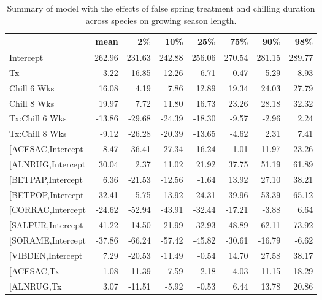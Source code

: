 \documentclass{article}\usepackage[]{graphicx}\usepackage[]{color}
\makeatletter
\newenvironment{kframe}{%
 \def\at@end@of@kframe{}%
 \ifinner\ifhmode%
  \def\at@end@of@kframe{\end{minipage}}%
  \begin{minipage}{\columnwidth}%
 \fi\fi%
 \def\FrameCommand##1{\hskip\@totalleftmargin \hskip-\fboxsep
 \colorbox{shadecolor}{##1}\hskip-\fboxsep
     \hskip-\linewidth \hskip-\@totalleftmargin \hskip\columnwidth}%
 \MakeFramed {\advance\hsize-\width
   \@totalleftmargin\z@ \linewidth\hsize
   \@setminipage}}%
 {\par\unskip\endMakeFramed%
 \at@end@of@kframe}
\makeatother
\begin{document}
\newpage
\begin{kframe}


{\ttfamily\noindent\bfseries\color{errorcolor}{\#\# Error in gsub("{}["{}, "{}"{}, modoutput\$term): invalid regular expression '[', reason 'Missing ']''}}\end{kframe}%
\begin{longtable}{lrrrrrrr}
\caption{Summary of model with the effects of false spring treatment and chilling duration across species on growing season length.} \\ 
  \hline
 & mean & 2\% & 10\% & 25\% & 75\% & 90\% & 98\% \\ 
  \hline \endhead  \hline
Intercept & 262.96 & 231.63 & 242.88 & 256.06 & 270.54 & 281.15 & 289.77 \\ 
  Tx & -3.22 & -16.85 & -12.26 & -6.71 & 0.47 & 5.29 & 8.93 \\ 
  Chill 6 Wks & 16.08 & 4.19 & 7.86 & 12.89 & 19.34 & 24.03 & 27.79 \\ 
  Chill 8 Wks & 19.97 & 7.72 & 11.80 & 16.73 & 23.26 & 28.18 & 32.32 \\ 
  Tx:Chill 6 Wks & -13.86 & -29.68 & -24.39 & -18.30 & -9.57 & -2.96 & 2.24 \\ 
  Tx:Chill 8 Wks & -9.12 & -26.28 & -20.39 & -13.65 & -4.62 & 2.31 & 7.41 \\ 
  [ACESAC,Intercept & -8.47 & -36.41 & -27.34 & -16.24 & -1.01 & 11.97 & 23.26 \\ 
  [ALNRUG,Intercept & 30.04 & 2.37 & 11.02 & 21.92 & 37.75 & 51.19 & 61.89 \\ 
  [BETPAP,Intercept & 6.36 & -21.53 & -12.56 & -1.64 & 13.92 & 27.10 & 38.21 \\ 
  [BETPOP,Intercept & 32.41 & 5.75 & 13.92 & 24.31 & 39.96 & 53.39 & 65.12 \\ 
  [CORRAC,Intercept & -24.62 & -52.94 & -43.91 & -32.44 & -17.21 & -3.88 & 6.64 \\ 
  [SALPUR,Intercept & 41.22 & 14.50 & 21.99 & 32.93 & 48.89 & 62.11 & 73.92 \\ 
  [SORAME,Intercept & -37.86 & -66.24 & -57.42 & -45.82 & -30.61 & -16.79 & -6.62 \\ 
  [VIBDEN,Intercept & 7.29 & -20.53 & -11.49 & -0.54 & 14.70 & 27.58 & 38.17 \\ 
  [ACESAC,Tx & 1.08 & -11.39 & -7.59 & -2.18 & 4.03 & 11.15 & 18.29 \\ 
  [ALNRUG,Tx & 3.07 & -11.51 & -5.92 & -0.53 & 6.44 & 13.78 & 20.86 \\ 

\end{longtable}
\end{document}
